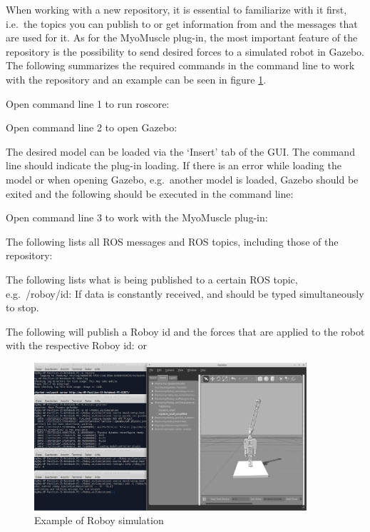 When working with a new repository, it is essential to familiarize with it first, i.e.\ the topics you can publish to or get information from and the messages that are used for it. As for the MyoMuscle plug-in, the most important feature of the repository is the possibility to send desired forces to a simulated robot in Gazebo\cite{BA}. The following summarizes the required commands in the command line to work with the repository and an example can be seen in figure \ref{fig:Roboy}.

Open command line 1 to run roscore:

Open command line 2 to open Gazebo:

The desired model can be loaded via the ‘Insert’ tab of the GUI. The command line should indicate the plug-in loading. If there is an error while loading the model or when opening Gazebo, e.g.\ another model is loaded, Gazebo should be exited and the following should be executed in the command line:

Open command line 3 to work with the MyoMuscle plug-in:

The following lists all ROS messages and ROS topics, including those of the repository:

The following lists what is being published to a certain ROS topic, e.g.\ /roboy/id:
If data is constantly received,  and  should be typed simultaneously to stop.

The following will publish a Roboy id and the forces that are applied to the robot with the respective Roboy id:
or

\begin{figure}[h]
\centering
   \includegraphics[width=0.9\textwidth] {figures/2.png}
 \caption{Example of Roboy simulation}
 \label{fig:Roboy}
\end{figure}

